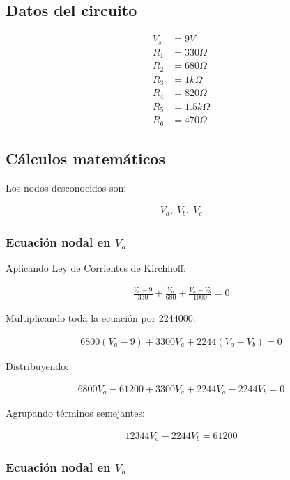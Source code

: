 \documentclass[conference]{IEEEtran}
\begin{document}
\subsection{Datos del circuito}

\begin{align*}
V_s &= 9V \\
R_1 &= 330\Omega \\
R_2 &= 680\Omega \\
R_3 &= 1k\Omega \\
R_4 &= 820\Omega \\
R_5 &= 1.5k\Omega \\
R_6 &= 470\Omega
\end{align*}

\subsection{Cálculos matemáticos}

Los nodos desconocidos son:

\begin{align*}
V_a,\;V_b,\;V_c
\end{align*}

\subsubsection{Ecuación nodal en $V_a$}

Aplicando Ley de Corrientes de Kirchhoff:

\begin{align*}
\frac{V_a-9}{330}+\frac{V_a}{680}+\frac{V_a-V_b}{1000}=0
\end{align*}

Multiplicando toda la ecuación por 2244000:

\begin{align*}
6800(V_a-9)+3300V_a+2244(V_a-V_b)=0
\end{align*}

Distribuyendo:

\begin{align*}
6800V_a-61200+3300V_a+2244V_a-2244V_b=0
\end{align*}

Agrupando términos semejantes:

\begin{align*}
12344V_a-2244V_b=61200
\end{align*}

\subsubsection{Ecuación nodal en $V_b$}
\end{document}
